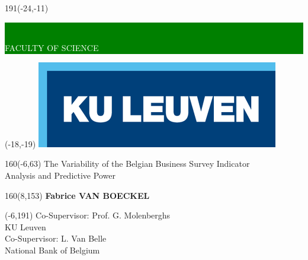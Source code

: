 \documentclass[12pt,a4paper,oneside]{book}
\begin{document}
\thispagestyle{empty}
\newcommand{\form}[1]{\scalebox{1.087}{\boldmath{#1}}}
\sffamily
%
\begin{textblock}{191}(-24,-11)
\colorbox{green}{\hspace{139mm}\ \parbox[c][18truemm]{52mm}{\textcolor{white}{FACULTY OF SCIENCE}}}
\end{textblock}
%
\begin{textblock}{70}(-18,-19)
\textblockcolour{}
\includegraphics*[height=19.8truemm]{Images/LogoKULeuven.png}
\end{textblock}
%
\begin{textblock}{160}(-6,63)
\textblockcolour{}
\vspace{-\parskip}
\flushleft
\fontsize{40}{42}\selectfont \textcolor{bluetitle}{The Variability of the Belgian Business Survey Indicator}\\[1.5mm]
\fontsize{20}{22}\selectfont Analysis and Predictive Power
\end{textblock}
%
%
\begin{textblock}{160}(8,153)
\textblockcolour{}
\vspace{-\parskip}
\flushright
\fontsize{14}{16}\selectfont \textbf{Fabrice VAN BOECKEL}
\end{textblock}
%
\begin{textblock}{70}(-6,191)
\textblockcolour{}
\vspace{-\parskip}
\flushleft
Co-Supervisor: Prof. G. Molenberghs\\[-2pt]
\textcolor{blueaff}{KU Leuven}\\[5pt]
Co-Supervisor: L. Van Belle\\[-2pt]
\textcolor{blueaff}{National Bank of Belgium}\\[5pt]
\end{textblock}
\end{document}
